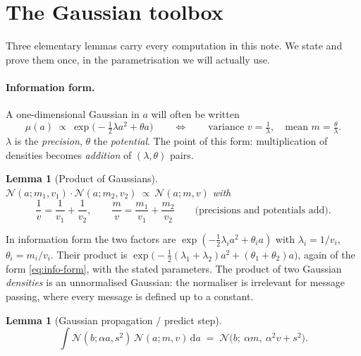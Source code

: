 \documentclass[11pt]{article}
\newtheorem{lemma}[proposition]{Lemma}
\theoremstyle{definition}
\newcommand{\N}{\mathcal{N}}
\newcommand{\dd}{\mathrm{d}}
\begin{document}
\section{The Gaussian toolbox}\label{sec:toolbox}

Three elementary lemmas carry every computation in this note. We state and
prove them once, in the parametrisation we will actually use.

\paragraph{Information form.} A one-dimensional Gaussian in $a$ will often be
written
\begin{equation}\label{eq:info-form}
  \mu(a)\ \propto\ \exp\!\big(-\tfrac12\lambda a^2+\theta a\big)
  \qquad\Longleftrightarrow\qquad
  \text{variance }v=\tfrac1\lambda,\quad \text{mean }m=\tfrac\theta\lambda .
\end{equation}
$\lambda$ is the \emph{precision}, $\theta$ the \emph{potential}. The point of
this form: multiplication of densities becomes \emph{addition} of
$(\lambda,\theta)$ pairs.

\begin{lemma}[Product of Gaussians]\label{lem:product}
$\N(a;m_1,v_1)\cdot\N(a;m_2,v_2)\ \propto\ \N(a;m,v)$ with
\[
  \frac1v=\frac1{v_1}+\frac1{v_2},\qquad
  \frac m v=\frac{m_1}{v_1}+\frac{m_2}{v_2}
  \qquad\text{(precisions and potentials add).}
\]
\end{lemma}

\begin{derivation}[\ref*{lem:product}]
In information form the two factors are
$\exp(-\tfrac12\lambda_ia^2+\theta_ia)$ with $\lambda_i=1/v_i$,
$\theta_i=m_i/v_i$. Their product is
$\exp\!\big(-\tfrac12(\lambda_1{+}\lambda_2)a^2+(\theta_1{+}\theta_2)a\big)$,
again of the form \eqref{eq:info-form}, with the stated parameters. The
product of two Gaussian \emph{densities} is an unnormalised Gaussian: the
normaliser is irrelevant for message passing, where every message is defined
up to a constant.
\end{derivation}

\begin{lemma}[Gaussian propagation / predict step]\label{lem:predict}
\[
  \int \N(b;\alpha a,s^2)\,\N(a;m,v)\,\dd a\;=\;\N\!\big(b;\ \alpha m,\
  \alpha^2v+s^2\big).
\]
\end{lemma}
\end{document}
